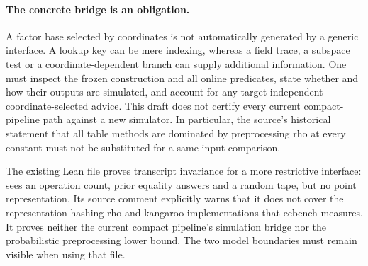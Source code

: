 \paragraph{The concrete bridge is an obligation.}
A factor base selected by coordinates is not automatically generated
by a generic interface. A lookup key can be mere indexing, whereas a
field trace, a subspace test or a coordinate-dependent branch can supply
additional information. One must inspect the frozen construction and
all online predicates, state whether and how their outputs are simulated,
and account for any target-independent coordinate-selected advice. This
draft does not certify every current compact-pipeline path against a
new simulator. In particular, the source's historical statement that
all table methods are dominated by preprocessing rho at every constant
must not be substituted for a same-input comparison.

The existing Lean file  proves transcript
invariance for a more restrictive interface:  sees an
operation count, prior equality answers and a random tape, but no point
representation. Its source comment explicitly warns that it does not
cover the representation-hashing rho and kangaroo implementations that
ecbench measures. It proves neither the current compact pipeline's
simulation bridge nor the probabilistic preprocessing lower bound.
The two model boundaries must remain visible when using that file.
